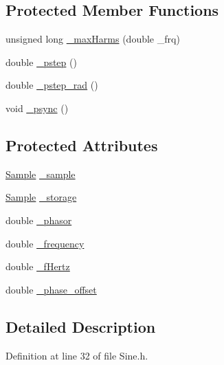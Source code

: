 \subsection*{Protected Member Functions}
\begin{DoxyCompactItemize}
\item 
unsigned long \hyperlink{classSignal_1_1ClassicGenerator_a7457e912d428de4e3fc27ec7fc49890e}{\+\_\+max\+Harms} (double \+\_\+frq)
\item 
double \hyperlink{classSignal_1_1ClassicGenerator_a255330ce8049b6e6d101b8d356cebe3d}{\+\_\+pstep} ()
\item 
double \hyperlink{classSignal_1_1ClassicGenerator_a6571276f584ff0be3862243d0f103a92}{\+\_\+pstep\+\_\+rad} ()
\item 
void \hyperlink{classSignal_1_1ClassicGenerator_a6454565b655bff7b8335735c2fabb4af}{\+\_\+psync} ()
\end{DoxyCompactItemize}
\subsection*{Protected Attributes}
\begin{DoxyCompactItemize}
\item 
\hyperlink{classSignal_1_1Sample}{Sample} \hyperlink{classSignal_1_1ClassicGenerator_a40313d0d806d6e44af7d41b3ef3a0822}{\+\_\+sample}
\item 
\hyperlink{classSignal_1_1Sample}{Sample} \hyperlink{classSignal_1_1ClassicGenerator_a1214faf589eccb01631700723900bbf9}{\+\_\+storage}
\item 
double \hyperlink{classSignal_1_1ClassicGenerator_ade9b66bc49d2d2f40a1390fc6374b8b2}{\+\_\+phasor}
\item 
double \hyperlink{classSignal_1_1SignalGenerator_a7f107461333bce68c5dad412db96a8c2}{\+\_\+frequency}
\item 
double \hyperlink{classSignal_1_1SignalGenerator_a85a4702347352bab1c71e0a8df8437d6}{\+\_\+f\+Hertz}
\item 
double \hyperlink{classSignal_1_1SignalGenerator_a6b4444d46747c8517171edbbf4b5588f}{\+\_\+phase\+\_\+offset}
\end{DoxyCompactItemize}


\subsection{Detailed Description}


Definition at line 32 of file Sine.\+h.



